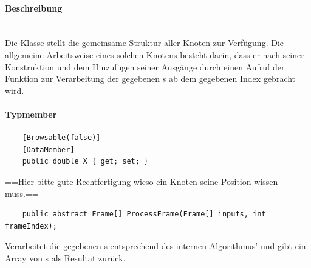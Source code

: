 \paragraph{Beschreibung}~\\
Die Klasse  stellt die gemeinsame Struktur aller Knoten zur Verfügung. Die allgemeine Arbeitsweise eines solchen Knotens besteht darin, dass er nach seiner Konstruktion und dem Hinzufügen seiner Ausgänge durch einen Aufruf der Funktion  zur Verarbeitung der gegebenen s ab dem gegebenen Index gebracht wird.

\paragraph{Typmember}
\begin{itemize}

	\begin{verbatim}
	[Browsable(false)]
	[DataMember]
	public double X { get; set; }
	\end{verbatim}
	==Hier bitte gute Rechtfertigung wieso ein Knoten seine Position wissen muss.==


	\begin{verbatim}
	public abstract Frame[] ProcessFrame(Frame[] inputs, int frameIndex);
	\end{verbatim}
	Verarbeitet die gegebenen s entsprechend des internen Algorithmus' und gibt ein Array von s als Resultat zurück.


\end{itemize}


